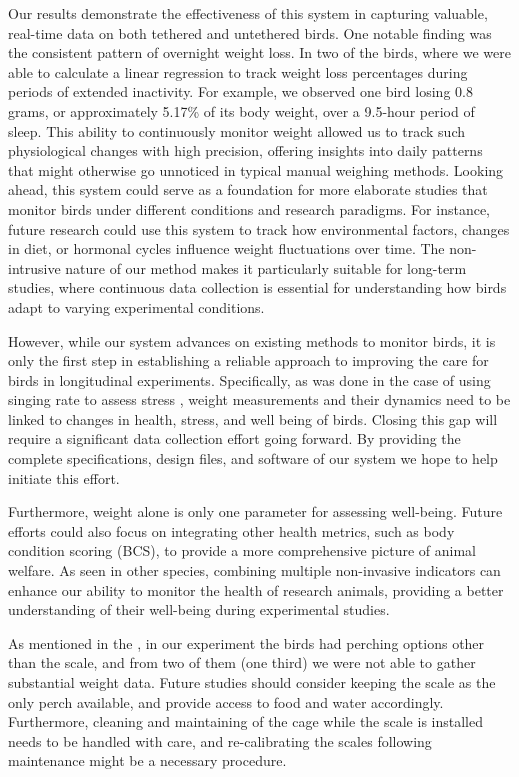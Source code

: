 \documentclass{article}
\begin{document}
Our results demonstrate the effectiveness of this system in capturing valuable, real-time data on both tethered and untethered birds. One notable finding was the consistent pattern of overnight weight loss. In two of the birds, where we were able to calculate a linear regression to track weight loss percentages during periods of extended inactivity. For example, we observed one bird losing 0.8 grams, or approximately 5.17\% of its body weight, over a 9.5-hour period of sleep. This ability to continuously monitor weight allowed us to track such physiological changes with high precision, offering insights into daily patterns that might otherwise go unnoticed in typical manual weighing methods. Looking ahead, this system could serve as a foundation for more elaborate studies that monitor birds under different conditions and research paradigms. For instance, future research could use this system to track how environmental factors, changes in diet, or hormonal cycles influence weight fluctuations over time. The non-intrusive nature of our method makes it particularly suitable for long-term studies, where continuous data collection is essential for understanding how birds adapt to varying experimental conditions.

However, while our system advances on existing methods to monitor birds, it is only the first step in establishing a reliable approach to improving the care for birds in longitudinal experiments. Specifically, as was done in the case of using singing rate to assess stress \cite{yamahachi2020undirected}, weight measurements and their dynamics need to be linked to changes in health, stress, and well being of birds. Closing this gap will require a significant data collection effort going forward. By providing the complete specifications, design files, and software of our system we hope to help initiate this effort.  

Furthermore, weight alone is only one parameter for assessing well-being. Future efforts could also focus on integrating other health metrics, such as body condition scoring (BCS)\cite{ullman1999body}, to provide a more comprehensive picture of animal welfare. As seen in other species, combining multiple non-invasive indicators can enhance our ability to monitor the health of research animals, providing a better understanding of their well-being during experimental studies\cite{cho2020analysis}.

As mentioned in the , in our experiment the birds had perching options other than the scale, and from two of them (one third) we were not able to gather substantial weight data. Future studies should consider keeping the scale as the only perch available, and provide access to food and water accordingly. Furthermore, cleaning and maintaining of the cage while the scale is installed needs to be handled with care, and re-calibrating the scales following maintenance might be a necessary procedure.
\end{document}
